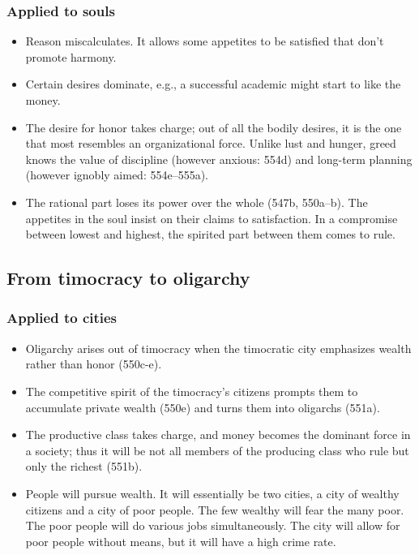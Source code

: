\documentclass[oneside]{article}
\begin{document}
\subsubsection*{Applied to souls}

\begin{itemize}
\item
  Reason miscalculates. It allows some appetites to be satisfied that
  don't promote harmony.
\item
  Certain desires dominate, e.g., a successful academic might start to
  like the money.
\item
  The desire for honor takes charge; out of all the
  bodily desires, it is the one that most resembles an organizational
  force. Unlike lust and hunger, greed knows the value of discipline
  (however anxious: 554d) and long-term planning (however ignobly aimed:
  554e--555a).
\item
  The rational part loses its power over the whole (547b, 550a--b). The
  appetites in the soul insist on their claims to satisfaction. In a
  compromise between lowest and highest, the spirited part between them
  comes to rule.
\end{itemize}

\subsection*{From timocracy to oligarchy}

\subsubsection*{Applied to cities} 

\begin{itemize}
\item Oligarchy arises out of timocracy when the timocratic city emphasizes
wealth rather than honor (550c-e). 
\item The competitive spirit of the timocracy's citizens prompts them to accumulate private wealth (550e)
and turns them into oligarchs (551a).
\item The productive class takes charge, and money becomes the dominant force in a society; thus it will be
not all members of the producing class who rule but only the richest (551b).
\item  People will pursue wealth. It will essentially be two cities,
a city of wealthy citizens and a city of poor people. The few wealthy
will fear the many poor. The poor people will do various jobs simultaneously. The
city will allow for poor people without means, but it will have a high crime rate. 
\end{itemize}
\end{document}

